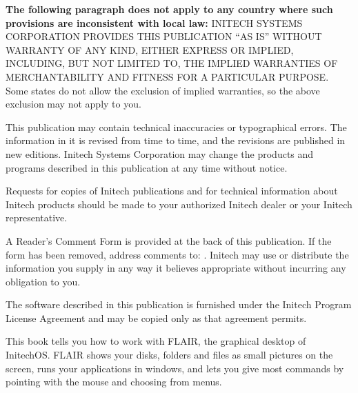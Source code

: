 \begin{TitleVerso}
\IsThisGoodForTheCompany
{\imLegalFont
\textbf{The following paragraph does not apply to any country where such
provisions are inconsistent with local law:} INITECH SYSTEMS CORPORATION
PROVIDES THIS PUBLICATION ``AS IS'' WITHOUT WARRANTY OF ANY KIND, EITHER
EXPRESS OR IMPLIED, INCLUDING, BUT NOT LIMITED TO, THE IMPLIED WARRANTIES OF
MERCHANTABILITY AND FITNESS FOR A PARTICULAR PURPOSE.  Some states do not
allow the exclusion of implied warranties, so the above exclusion may not
apply to you.\par
This publication may contain technical inaccuracies or typographical errors.
The information in it is revised from time to time, and the revisions are
published in new editions.  Initech Systems Corporation may change the
products and programs described in this publication at any time without
notice.\par
Requests for copies of Initech publications and for technical information
about Initech products should be made to your authorized Initech dealer or
your Initech representative.\par}

{\footnotesize
A Reader's Comment Form is provided at the back of this publication.  If the
form has been removed, address comments to: \InitechAddressLine.
Initech may use or distribute the information you supply in any way it
believes appropriate without incurring any obligation to you.\par
The software described in this publication is furnished under the Initech
Program License Agreement and may be copied only as that agreement
permits.\par}
\end{TitleVerso}

This book tells you how to work with FLAIR\tm{}, the graphical desktop of
InitechOS\tm{}.  FLAIR shows your disks, folders and files as small pictures
on the screen, runs your applications in windows, and lets you give most
commands by pointing with the mouse and choosing from menus.

